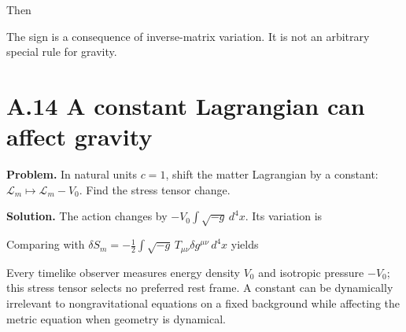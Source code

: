 \documentclass[
  11pt,
  letterpaper,
  oneside,
  openany]{scrbook}
\begin{document}
Then

\begin{center}
\begingroup
{}
\ifdim\wd\grmathbox>\linewidth
\resizebox{\linewidth}{!}{\usebox{\grmathbox}}
\else\usebox{\grmathbox}\fi
\endgroup
\end{center}

The sign is a consequence of inverse-matrix variation. It is not an
arbitrary special rule for gravity.

\hypertarget{a.14-a-constant-lagrangian-can-affect-gravity}{%
\section{A.14 A constant Lagrangian can affect
gravity}\label{a.14-a-constant-lagrangian-can-affect-gravity}}

\textbf{Problem.} In natural units \(c=1\), shift the matter Lagrangian
by a constant: \(\mathcal L_m\mapsto\mathcal L_m-V_0\). Find the stress
tensor change.

\textbf{Solution.} The action changes by \(-V_0\int\sqrt{-g}\,d^4x\).
Its variation is

\begin{center}
\begingroup
{}
\ifdim\wd\grmathbox>\linewidth
\resizebox{\linewidth}{!}{\usebox{\grmathbox}}
\else\usebox{\grmathbox}\fi
\endgroup
\end{center}

Comparing with
\(\delta S_m=-\tfrac12\int\sqrt{-g}\,T_{\mu\nu}\delta g^{\mu\nu}\,d^4x\)
yields

\begin{center}
\begingroup
{}
\ifdim\wd\grmathbox>\linewidth
\resizebox{\linewidth}{!}{\usebox{\grmathbox}}
\else\usebox{\grmathbox}\fi
\endgroup
\end{center}

Every timelike observer measures energy density \(V_0\) and isotropic
pressure \(-V_0\); this stress tensor selects no preferred rest frame. A
constant can be dynamically irrelevant to nongravitational equations on
a fixed background while affecting the metric equation when geometry is
dynamical.
\end{document}
